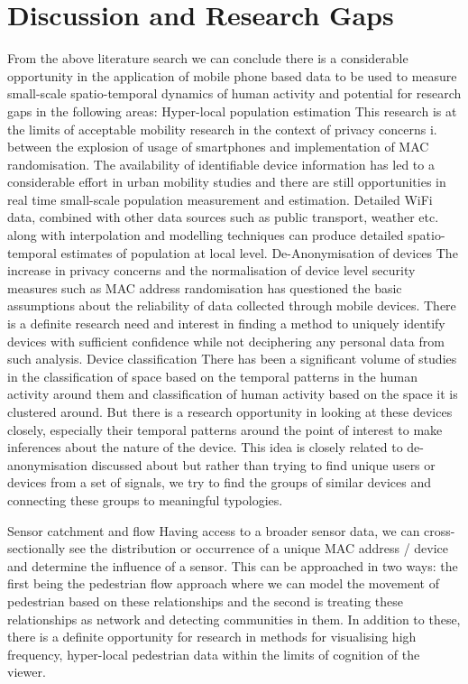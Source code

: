 \section{Discussion and Research Gaps}

From the above literature search we can conclude there is a considerable opportunity in the application of mobile phone based data to be used to measure small-scale spatio-temporal dynamics of human activity and potential for research gaps in the following areas:
Hyper-local population estimation This research is at the limits of acceptable mobility research in the context of privacy concerns i.
 between the explosion of usage of smartphones and implementation of MAC randomisation.
The availability of identifiable device information has led to a considerable effort in urban mobility studies and there are still opportunities in real time small-scale population measurement and estimation.
Detailed WiFi data, combined with other data sources such as public transport, weather etc.
along with interpolation and modelling techniques can produce detailed spatio-temporal estimates of population at local level.
De-Anonymisation of devices The increase in privacy concerns and the normalisation of device level security measures such as MAC address randomisation has questioned the basic assumptions about the reliability of data collected through mobile devices.
There is a definite research need and interest in finding a method to uniquely identify devices with sufficient confidence while not deciphering any personal data from such analysis.
Device classification There has been a significant volume of studies in the classification of space based on the temporal patterns in the human activity around them and classification of human activity based on the space it is clustered around.
But there is a research opportunity in looking at these devices closely, especially their temporal patterns around the point of interest to make inferences about the nature of the device.
This idea is closely related to de-anonymisation discussed about but rather than trying to find unique users or devices from a set of signals, we try to find the groups of similar devices and connecting these groups to meaningful typologies.

Sensor catchment and flow Having access to a broader sensor data, we can cross-sectionally see the distribution or occurrence of a unique MAC address / device and determine the influence of a sensor.
This can be approached in two ways: the first being the pedestrian flow approach where we can model the movement of pedestrian based on these relationships and the second is treating these relationships as network and detecting communities in them.
In addition to these, there is a definite opportunity for research in methods for visualising high frequency, hyper-local pedestrian data within the limits of cognition of the viewer.

